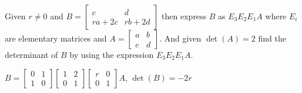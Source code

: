 
\begin{Exercise}[
name={},
title={}, 
difficulty=0,
origin={\cite{YL}}]
Given $r\neq 0$ and  
$B=
\begin{bmatrix}
c & d\\
ra+2c & rb + 2d
\end{bmatrix}$
then express $B$ as $E_3E_2E_1A$ where $E_i$ are elementary matrices and 
$A=\begin{bmatrix}
a & b\\
c & d
\end{bmatrix}
$.  And given $\det(A)=2$ find the determinant of $B$ by using the expression $E_3E_2E_1A$.
\end{Exercise}

\begin{Answer}
$B=\begin{bmatrix}
0 & 1\\
1 & 0
\end{bmatrix}
\begin{bmatrix}
1 & 2\\
0 & 1
\end{bmatrix}
\begin{bmatrix}
r & 0\\
0 & 1
\end{bmatrix}
A$, $\det(B)=-2r$
\end{Answer}
